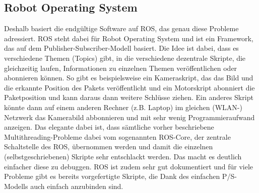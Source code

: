 \subsection{Robot Operating System}
Deshalb basiert die endgültige Software auf ROS, das genau diese Probleme adressiert. ROS steht dabei für Robot Operating System und ist ein Framework, das auf dem Publisher-Subscriber-Modell basiert. Die Idee ist dabei, dass es verschiedene Themen (Topics) gibt, in die verschiedene dezentrale Skripte, die gleichzeitig laufen, Informationen zu einzelnen Themen veröffentlichen oder abonnieren können. So gibt es beispielsweise ein Kameraskript, das das Bild und die erkannte Position des Pakets veröffentlicht und ein Motorskript abonniert die Paketposition und kann daraus dann weitere Schlüsse ziehen. Ein anderes Skript könnte dann auf einem anderen Rechner (z.B. Laptop) im gleichen (WLAN-) Netzwerk das Kamerabild abbonnieren und mit sehr wenig Programmieraufwand anzeigen. Das elegante dabei ist, dass sämtliche vorher beschriebene Multithreading-Probleme dabei vom sogenannten ROS-Core, der zentrale Schaltstelle des ROS, übernommen werden und damit die einzelnen (selbstgeschriebenen) Skripte sehr entschlackt werden. Das macht es deutlich einfacher diese zu debuggen. ROS ist zudem sehr gut dokumentiert und für viele Probleme gibt es bereits vorgefertigte Skripte, die Dank des einfachen P/S-Modells auch einfach anzubinden sind.
\pagebreak
